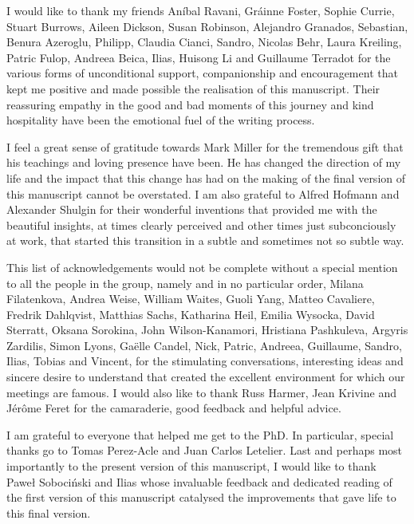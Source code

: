 \documentclass[phd,lfcs]{infthesis}
\begin{document}
\begin{preliminary}
\begin{acknowledgements}
  I would like to thank my friends
  An\'ibal Ravani, Gr\'ainne Foster,
  Sophie Currie, Stuart Burrows, Aileen Dickson, Susan Robinson,
  Alejandro Granados, Sebastian, Benura Azeroglu,
  Philipp, Claudia Cianci, Sandro,
  Nicolas Behr, Laura Kreiling,
  Patric Fulop, Andreea Beica,
  Ilias, Huisong Li and Guillaume Terradot
  for the various forms of unconditional support,
  companionship and encouragement
  that kept me positive and made possible
  the realisation of this manuscript.
  Their reassuring empathy
  in the good and bad moments of this journey
  and kind hospitality
  have been the emotional fuel of the writing process.

  \pagebreak

  I feel a great sense of gratitude towards
  Mark Miller for the tremendous gift
  that his teachings and loving presence
  have been. %
  He has changed the direction of my life
  and the impact that this change has had
  on the making of the final version of this manuscript
  cannot be overstated.
  I am also grateful to Alfred Hofmann and Alexander Shulgin
  for their wonderful inventions that provided me
  with the beautiful insights, %
  at times clearly perceived
  and other times just subconciously at work,
  that started this transition in a subtle
  and sometimes not so subtle way.

  This list of acknowledgements would not be complete
  without a special mention to all the people in the group,
  namely and in no particular order,
  Milana Filatenkova, Andrea Weise,
  William Waites, Guoli Yang, Matteo Cavaliere,
  Fredrik Dahlqvist, Matthias Sachs,
  Katharina Heil, Emilia Wysocka,
  David Sterratt, Oksana Sorokina, John Wilson-Kanamori,
  Hristiana Pashkuleva, Argyris Zardilis, Simon Lyons, Gaëlle Candel,
  Nick, Patric, Andreea, Guillaume, Sandro, Ilias, Tobias and Vincent,
  for the stimulating conversations, interesting ideas
  and sincere desire to understand
  that created the excellent environment
  for which our meetings are famous.
  I would also like to thank
  Russ Harmer, Jean Krivine and J\'er\^ome Feret
  for the camaraderie, good feedback and helpful advice.

  I am grateful to %
  everyone that helped me get to the PhD.
  In particular, special thanks go to Tomas Perez-Acle
  and Juan Carlos Letelier. %
  Last and perhaps most importantly
  to the present version of this manuscript,
  I would like to thank Paweł Sobociński and Ilias
  whose invaluable feedback and dedicated reading
  of the first version of this manuscript catalysed
  the improvements that gave life to this final version.


\end{acknowledgements}
\end{preliminary}
\end{document}
